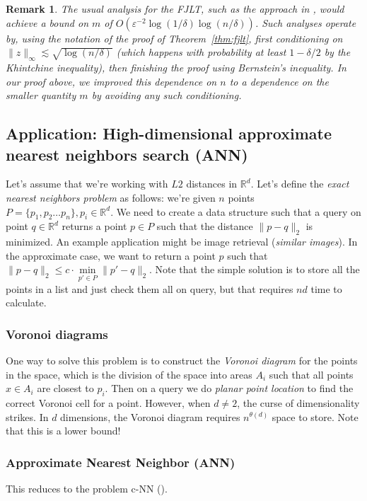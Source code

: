 \documentclass[11pt]{article}
\newcommand{\eps}{\varepsilon}
\newcommand{\R}{\mathbb{R}}
\newcommand{\on}{\operatorname}
\newtheorem{remark}[theorem]{Remark}
\begin{document}
\begin{remark}
\textup{
The usual analysis for the FJLT, such as the approach in \cite{ailon2009fast}, would achieve a bound on $m$ of $O(\eps^{-2}\log(1/\delta)\log(n/\delta))$. Such analyses operate by, using the notation of the proof of Theorem~\ref{thm:fjlt}, first conditioning on $\|z\|_\infty \lesssim \sqrt{\log(n/\delta)}$ (which happens with probability at least $1-\delta/2$ by the Khintchine inequality), then finishing the proof using Bernstein's inequality. In our proof above, we improved this dependence on $n$ to a dependence on the smaller quantity $m$ by avoiding any such conditioning.
}
\end{remark}

\subsection{Application: High-dimensional approximate nearest neighbors search (ANN)}

Let's assume that we're working with $L2$ distances in $\R^d$. Let's define the \emph{exact nearest neighbors problem} as follows: we're given $n$ points $P = \{p_1, p_2\ldots p_n\}, p_i \in \R^d$. We need to create a data structure such that a query on point $q \in \R^d$ returns a point $p \in P$ such that the distance $\|p - q\|_2$ is minimized. An example application might be image retrieval (\emph{similar images}). In the approximate case, we want to return a point $p$ such that $\|p - q\|_2 \leq c\cdot \underset{p' \in P}{\on{min}}\|p' - q\|_2$. Note that the simple solution is to store all the points in a list and just check them all on query, but that requires $nd$ time to calculate.

\subsubsection{Voronoi diagrams}
One way to solve this problem is to construct the \emph{Voronoi diagram} for the points in the space, which is the division of the space into areas $A_i$ such that all points $x \in A_i$ are closest to $p_i$. Then on a query we do \emph{planar point location} to find the correct Voronoi cell for a point. However, when $d \neq 2$, the curse of dimensionality strikes. In $d$ dimensions, the Voronoi diagram requires $n^{\theta(d)}$ space to store. Note that this is a lower bound!

\subsubsection{Approximate Nearest Neighbor (ANN)}
This reduces to the problem c-NN (\cite{har2012approximate}). 
\end{document}
